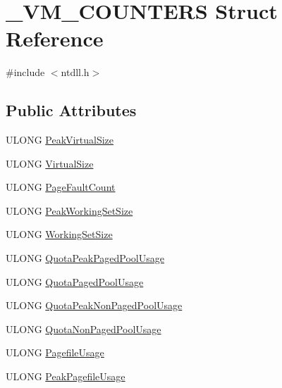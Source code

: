 \section{\-\_\-\-V\-M\-\_\-\-C\-O\-U\-N\-T\-E\-R\-S Struct Reference}
\label{struct___v_m___c_o_u_n_t_e_r_s}


{\ttfamily \#include $<$ntdll.\-h$>$}

\subsection*{Public Attributes}
\begin{DoxyCompactItemize}
\item 
U\-L\-O\-N\-G \hyperlink{struct___v_m___c_o_u_n_t_e_r_s_ac48c33c994d32f1e0c1c346e1725670e}{Peak\-Virtual\-Size}
\item 
U\-L\-O\-N\-G \hyperlink{struct___v_m___c_o_u_n_t_e_r_s_a7e98139696f3a644ce0f1288d3348023}{Virtual\-Size}
\item 
U\-L\-O\-N\-G \hyperlink{struct___v_m___c_o_u_n_t_e_r_s_a2757c07a0ab6cb6c18f21a6b761907ac}{Page\-Fault\-Count}
\item 
U\-L\-O\-N\-G \hyperlink{struct___v_m___c_o_u_n_t_e_r_s_ad4eb903c55c9f8e917f274a0d084b515}{Peak\-Working\-Set\-Size}
\item 
U\-L\-O\-N\-G \hyperlink{struct___v_m___c_o_u_n_t_e_r_s_af890a56bed318d817fa00dcb5d2d3424}{Working\-Set\-Size}
\item 
U\-L\-O\-N\-G \hyperlink{struct___v_m___c_o_u_n_t_e_r_s_a4a89875b6f19fd0b35a614064d4cc432}{Quota\-Peak\-Paged\-Pool\-Usage}
\item 
U\-L\-O\-N\-G \hyperlink{struct___v_m___c_o_u_n_t_e_r_s_a2839daf52a3ee13dbe8c49f51a173f8f}{Quota\-Paged\-Pool\-Usage}
\item 
U\-L\-O\-N\-G \hyperlink{struct___v_m___c_o_u_n_t_e_r_s_ab4905e4b74bbb097a6217c94737890a9}{Quota\-Peak\-Non\-Paged\-Pool\-Usage}
\item 
U\-L\-O\-N\-G \hyperlink{struct___v_m___c_o_u_n_t_e_r_s_a7f0db97615882c46a67ee917fd2fee00}{Quota\-Non\-Paged\-Pool\-Usage}
\item 
U\-L\-O\-N\-G \hyperlink{struct___v_m___c_o_u_n_t_e_r_s_aa636646b19a787f814921836a4e3fd97}{Pagefile\-Usage}
\item 
U\-L\-O\-N\-G \hyperlink{struct___v_m___c_o_u_n_t_e_r_s_a0ca63108f45d218421f793c460e25cd8}{Peak\-Pagefile\-Usage}
\end{DoxyCompactItemize}


